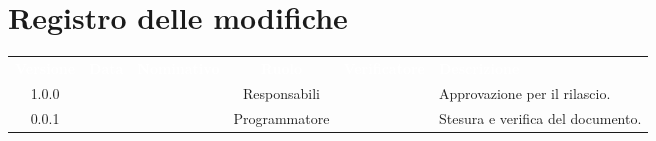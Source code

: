 \section*{Registro delle modifiche}
{
\renewcommand{\arraystretch}{1.5}
\centering
\begin{longtable}{ c c  C{2.3cm} c C{3cm} C{3.2cm}}
\textcolor{white}{\textbf{Versione}} & \textcolor{white}{\textbf{Data}} & \textcolor{white}{\textbf{Nominativo}} & \textcolor{white}{\textbf{Ruolo}} & 
\textcolor{white}{\textbf{Verificatore}}& \textcolor{white}{\textbf{Descrizione}}\\	


1.0.0 & \Data{} & \CE{} & Responsabili & \MC{} & Approvazione per il rilascio.  \\
		
0.0.1 & \Data{} & \BR{} & Programmatore & \MC{} & Stesura e verifica del documento.  \\
		
		
\end{longtable}
}